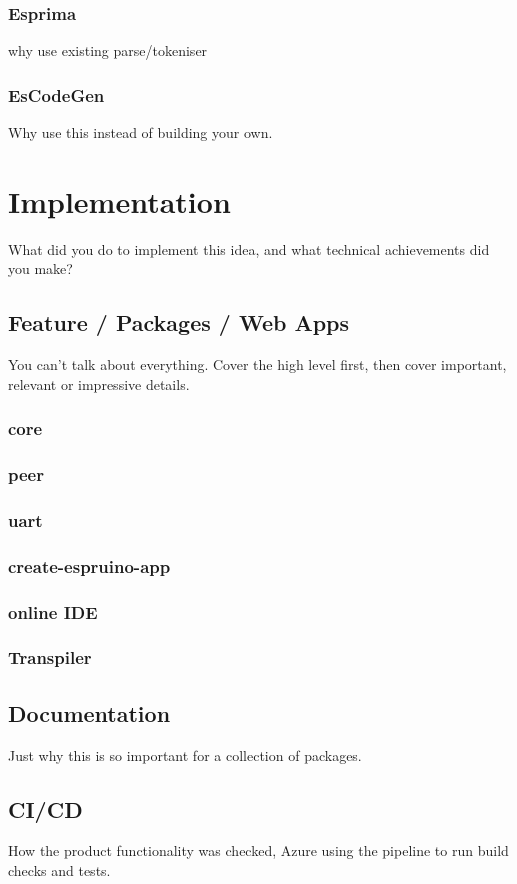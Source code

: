\documentclass{l4proj}
\begin{document}
\subsection{Esprima}
\text why use existing parse/tokeniser
\subsection{EsCodeGen}
\text Why use this instead of building your own.
\chapter{Implementation}
What did you do to implement this idea, and what technical achievements did you make?
\section{Feature / Packages / Web Apps}
You can't talk about everything. Cover the high level first, then cover important, relevant or impressive details.
\subsection{core}
\subsection{peer}
\subsection{uart}
\subsection{create-espruino-app}
\subsection{online IDE}
\subsection{Transpiler}

\section{Documentation}
\text Just why this is so important for a collection of packages.
\section{CI/CD}
\text How the product functionality was checked, Azure using the pipeline to run build checks and tests.
\end{document}
